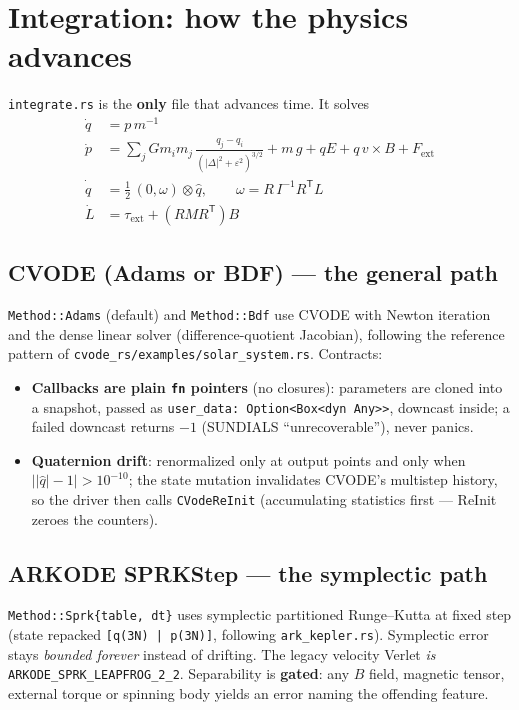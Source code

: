 \documentclass[11pt]{article}
\newcommand{\code}[1]{\texttt{#1}}
\begin{document}
\section{Integration: how the physics advances}

\code{integrate.rs} is the \textbf{only} file that advances time. It
solves
\begin{align*}
\dot q &= p\,m^{-1}\\
\dot p &= \textstyle\sum_j G m_i m_j\,
          \frac{q_j-q_i}{(|\Delta|^2+\varepsilon^2)^{3/2}}
          + m\,g + qE + q\,v\times B + F_{\text{ext}}\\
\dot{\hat q} &= \tfrac12\,(0,\omega)\otimes\hat q,
   \qquad \omega = R\,I^{-1}R^{\mathsf T}L\\
\dot L &= \tau_{\text{ext}} + (R M R^{\mathsf T})B
\end{align*}

\subsection{CVODE (Adams or BDF) --- the general path}
\code{Method::Adams} (default) and \code{Method::Bdf} use CVODE with
Newton iteration and the dense linear solver (difference-quotient
Jacobian), following the reference pattern of
\code{cvode\_rs/examples/solar\_system.rs}. Contracts:
\begin{itemize}
\item \textbf{Callbacks are plain \code{fn} pointers} (no closures):
      parameters are cloned into a snapshot, passed as
      \code{user\_data: Option<Box<dyn Any>>}, downcast inside; a failed
      downcast returns $-1$ (SUNDIALS ``unrecoverable''), never panics.
\item \textbf{Quaternion drift}: renormalized only at output points and
      only when $\bigl||\hat q|-1\bigr| > 10^{-10}$; the state mutation
      invalidates CVODE's multistep history, so the driver then calls
      \code{CVodeReInit} (accumulating statistics first --- ReInit
      zeroes the counters).
\end{itemize}

\subsection{ARKODE SPRKStep --- the symplectic path}
\code{Method::Sprk\{table, dt\}} uses symplectic partitioned
Runge--Kutta at fixed step (state repacked \code{[q(3N) | p(3N)]},
following \code{ark\_kepler.rs}). Symplectic error stays \emph{bounded
forever} instead of drifting. The legacy velocity Verlet \emph{is}
\code{ARKODE\_SPRK\_LEAPFROG\_2\_2}. Separability is \textbf{gated}:
any $B$ field, magnetic tensor, external torque or spinning body yields
an error naming the offending feature.
\end{document}
